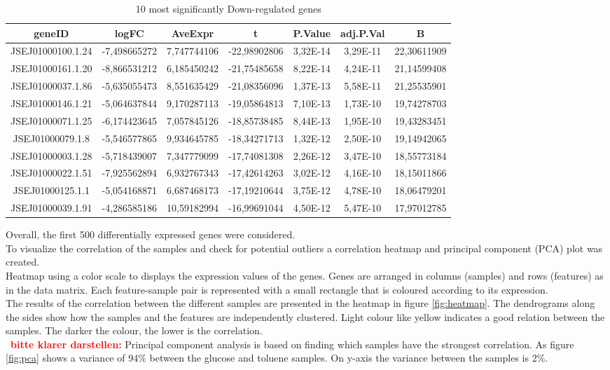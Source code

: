 \documentclass[12pt, a4paper]{report}
\newcommand{\HT}[1]{\textcolor{red}\textbf{#1}}
\begin{document}
\begin{table}[H]
	\centering
	\scriptsize
	\begin{tabular}{c|c|c|c|c|c|c}
		\textbf{geneID}& \textbf{logFC}&\textbf{AveExpr}&\textbf{t}&\textbf{P.Value}&\textbf{adj.P.Val}& \textbf{B}\\
		\hline
		JSEJ01000100.1.24&	-7,498665272&	7,747744106&	-22,98902806&	3,32E-14&	3,29E-11&	22,30611909\\
		JSEJ01000161.1.20&	-8,866531212&	6,185450242	&-21,75485658	&8,22E-14&	4,24E-11&	21,14599408\\
		JSEJ01000037.1.86&	-5,635055473&	8,551635429	&-21,08356096&	1,37E-13&	5,58E-11&	21,25535901\\
		JSEJ01000146.1.21	&-5,064637844&	9,170287113	&-19,05864813&	7,10E-13&	1,73E-10&	19,74278703\\
		JSEJ01000071.1.25	&-6,174423645&	7,057845126	&-18,85738485&	8,44E-13&	1,95E-10&	19,43283451\\
		JSEJ01000079.1.8	&-5,546577865&	9,934645785	&-18,34271713&	1,32E-12&	2,50E-10&	19,14942065\\
		JSEJ01000003.1.28&	-5,718439007&	7,347779099	&-17,74081308&	2,26E-12&	3,47E-10&	18,55773184\\
		JSEJ01000022.1.51&	-7,925562894&	6,932767343	&-17,42614263&	3,02E-12&	4,16E-10&	18,15011866\\
		JSEJ01000125.1.1&	-5,054168871&	6,687468173	&-17,19210644&	3,75E-12&	4,78E-10&	18,06479201\\
		JSEJ01000039.1.91&	-4,286585186&	10,59182994	&-16,99691044&	4,50E-12&	5,47E-10&	17,97012785\\
		\hline
	\end{tabular}
	\caption{10 most significantly Down-regulated genes}
\end{table}

Overall, the first 500 differentially expressed genes were considered. \\
To visualize the correlation of the samples and check for potential outliers a correlation heatmap and principal component (PCA) plot was created. \\
Heatmap using a color scale to displays the expression values of the genes. Genes are arranged in columns (samples) and rows (features) as in the data matrix. Each feature-sample pair is represented with a small rectangle that is coloured according to its expression. \\
The results of the correlation between the different samples are presented in the heatmap in figure \ref{fig:heatmap}. The dendrograms along the sides show how the samples and the features are independently clustered. Light colour like yellow indicates a good relation between the samples. The darker the colour, the lower is the correlation. \\
~\HT{bitte klarer darstellen:} Principal component analysis is based on finding which samples have the strongest correlation. As figure \ref{fig:pca} shows a variance of 94$\%$ between the glucose and toluene samples. On y-axis the variance between the samples is 2$\%$. 
\ \\
\end{document}

